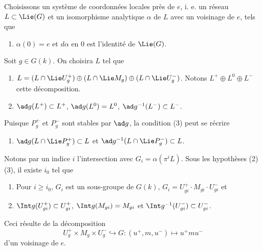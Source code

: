 
Choisissons un système de coordonnées locales près de \(e\), i. e. un réseau
\(L\subset\Lie(G)\) et un isomorphisme analytique \(\alpha\) de \(L\) avec un
voisinage de \(e\), tels que

\begin{enumerate}[label=(\arabic*)]
\item \(\alpha(0)=e\) et \(d\alpha\) en \(0\) est l'identité de \(\Lie(G)\).
\end{enumerate}

Soit \(g\in G(k)\). On choisira \(L\) tel que

\begin{enumerate}[label=(\arabic*),start=2]
\item
  \(L=(L\cap\Lie U_g^{+})\oplus(L\cap\Lie M_g)\oplus
  (L\cap\Lie U_g^{-})\). Notons \(L^{+}\oplus L^{0}\oplus L^{-}\) cette
  décomposition.
\item
  \(\ad g(L^{+})\subset L^{+}\), \(\ad g(L^{0})=L^{0}\),
  \(\ad g^{-1}(L^{-})\subset L^{-}\).
\end{enumerate}

Puisque \(P_g^{+}\) et \(P_g^{-}\) sont stables par \(\ad g\), la condition
(3) peut se récrire

\begin{enumerate}
\item[(3')]
  \(\ad g(L\cap\Lie P_g^{+})\subset L\) et
  \(\ad g^{-1}(L\cap\Lie P_g^{-})\subset L\).
\end{enumerate}

Notons par un indice \(i\) l'intersection avec
\(G_i=\alpha(\pi^{i}L)\). Sous les hypothèses (2) (3), il existe \(i_0\) tel
que

\begin{enumerate}[label=(\arabic*),start=4]
\item Pour \(i\geq i_0\), \(G_i\) est un sous-groupe de \(G(k)\),
  \(G_i=U_{gi}^{+}\cdot M_{gi}\cdot U_{gi}^{-}\) et
\item \(\Int g(U_{gi}^{+})\subset U_{gi}^{+}\),
  \(\Int g(M_{gi})=M_{gi}\) et
  \(\Int g^{-1}(U_{gi}^{-})\subset U_{gi}^{-}\).
\end{enumerate}

Ceci résulte de la décomposition
\[
  U_g^{+}\times M_g\times U_g^{-}\hookrightarrow G:
  (u^{+},m,u^{-})\longmapsto u^{+}mu^{-}
\]
d'un voisinage de \(e\).

